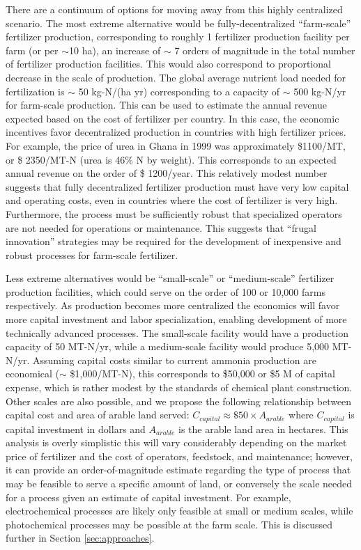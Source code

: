 There are a continuum of options for moving away from this highly centralized scenario. The most extreme alternative would be fully-decentralized ``farm-scale'' fertilizer production, corresponding to roughly 1 fertilizer production facility per farm (or per $\sim$10 ha), an increase of $\sim$ 7 orders of magnitude in the total number of fertilizer production facilities. This would also correspond to proportional decrease in the scale of production. The global average nutrient load needed for fertilization is $\sim$ 50 kg-N/(ha yr) \cite{}%
corresponding to a capacity of $\sim$ 500 kg-N/yr for farm-scale production. This can be used to estimate the annual revenue expected based on the cost of fertilizer per country. 
In this case, the economic incentives favor decentralized production in countries with high fertilizer prices. 
For example, the price of urea in Ghana in 1999 was approximately \$1100/MT, or \$ 2350/MT-N (urea is 46\% N by weight). %
This corresponds to an expected annual revenue on the order of \$ 1200/year. This relatively modest number suggests that fully decentralized fertilizer production must have very low capital and operating costs, even in countries where the cost of fertilizer is very high. Furthermore, the process must be sufficiently robust that specialized operators are not needed for operations or maintenance. This suggests that ``frugal innovation'' strategies \cite{Weyrauch_2016} may be required for the development of inexpensive and robust processes for farm-scale fertilizer.

Less extreme alternatives would be ``small-scale'' or ``medium-scale'' fertilizer production facilities, which could serve on the order of 100 or 10,000 farms respectively. As production becomes more centralized the economics will favor more capital investment and labor specialization, enabling development of more technically advanced processes. The small-scale facility would have a production capacity of 50 MT-N/yr, while a medium-scale facility would produce 5,000 MT-N/yr. Assuming capital costs similar to current ammonia production are economical ($\sim$ \$1,000/MT-N), this corresponds to \$50,000 or \$5 M of capital expense, which is rather modest by the standards of chemical plant construction. Other scales are also possible, and we propose the following relationship between capital cost and area of arable land served: $C_{capital} \approx \$ 50 \times A_{arable}$ where $C_{capital}$ is capital investment in dollars and $A_{arable}$ is the arable land area in hectares. This analysis is overly simplistic this will vary considerably depending on the market price of fertilizer and the cost of operators, feedstock, and maintenance; however, it can provide an order-of-magnitude estimate regarding the type of process that may be feasible to serve a specific amount of land, or conversely the scale needed for a process given an estimate of capital investment. For example, electrochemical processes are likely only feasible at small or medium scales, while photochemical processes may be possible at the farm scale. This is discussed further in Section \ref{sec:approaches}.

